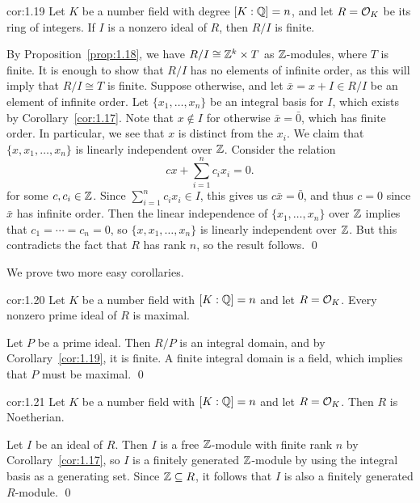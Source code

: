 \begin{cor}{cor:1.19}
    Let $K$ be a number field with degree $[K : \mathbb{Q}] = n$, and let 
    $R = {\cal O}_K$ be its ring of integers. 
    If $I$ is a nonzero ideal of $R$, then $R/I$ is finite. 
\end{cor}\vspace{-0.15cm}
\begin{pf}
    By Proposition~\ref{prop:1.18}, we have $R/I \cong \mathbb{Z}^k \times T$ 
    as $\mathbb{Z}$-modules, where $T$ is finite. It is enough to show that 
    $R/I$ has no elements of infinite order, as this will imply that 
    $R/I \cong T$ is finite. Suppose otherwise, and let $\bar{x} = 
    x + I \in R/I$ be an element of infinite order. Let $\{x_1, \dots, x_n\}$
    be an integral basis for $I$, which exists by Corollary~\ref{cor:1.17}. 
    Note that $x \notin I$ for otherwise $\bar{x} = \bar{0}$, which has 
    finite order. In particular, we see that $x$ is distinct from 
    the $x_i$. We claim that $\{x, x_1, \dots, x_n\}$ is linearly independent 
    over $\mathbb{Z}$. Consider the relation 
    \[ cx + \sum_{i=1}^n c_i x_i = 0. \] 
    for some $c, c_i \in \mathbb{Z}$. Since $\sum_{i=1}^n c_i x_i \in I$, this gives 
    us $c\bar{x} = \bar{0}$, and thus $c = 0$ since $\bar{x}$ has infinite 
    order. Then the linear independence of $\{x_1, \dots, x_n\}$ over $\mathbb{Z}$ 
    implies that $c_1 = \cdots = c_n = 0$, so $\{x, x_1, \dots, x_n\}$ 
    is linearly independent over $\mathbb{Z}$. But this contradicts the fact that $R$ 
    has rank $n$, so the result follows. \qed
\end{pf}\vspace{-0.25cm}

We prove two more easy corollaries. 

\begin{cor}{cor:1.20}
    Let $K$ be a number field with $[K : \mathbb{Q}] = n$ and let $R = {\cal O}_K$. 
    Every nonzero prime ideal of $R$ is maximal.
\end{cor}\vspace{-0.15cm}
\begin{pf}
    Let $P$ be a prime ideal. Then $R/P$ is an integral domain, and by 
    Corollary~\ref{cor:1.19}, it is finite. A finite integral 
    domain is a field, which implies that $P$ must be maximal. \qed
\end{pf}

\begin{cor}{cor:1.21}
    Let $K$ be a number field with $[K : \mathbb{Q}] = n$ and let $R = {\cal O}_K$. 
    Then $R$ is Noetherian. 
\end{cor}\vspace{-0.15cm}
\begin{pf}
    Let $I$ be an ideal of $R$. Then $I$ is a free $\mathbb{Z}$-module with 
    finite rank $n$ by Corollary~\ref{cor:1.17}, so $I$ is a finitely 
    generated $\mathbb{Z}$-module by using the integral basis as a generating set. 
    Since $\mathbb{Z} \subseteq R$, it follows that $I$ is also a finitely 
    generated $R$-module. \qed
\end{pf}